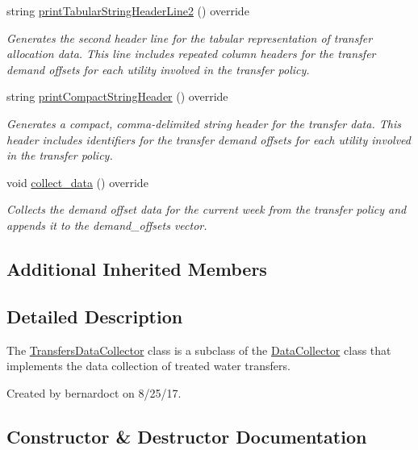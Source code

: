 \begin{DoxyCompactItemize}
string \mbox{\hyperlink{classTransfersDataCollector_ade6b896383f079d8973076e6b9a8053a}{print\+Tabular\+String\+Header\+Line2}} () override
\begin{DoxyCompactList}\small\item\em Generates the second header line for the tabular representation of transfer allocation data. This line includes repeated column headers for the transfer demand offsets for each utility involved in the transfer policy. \end{DoxyCompactList}\item 
string \mbox{\hyperlink{classTransfersDataCollector_a29750b8b76fa82d70d4f472a0e36ceba}{print\+Compact\+String\+Header}} () override
\begin{DoxyCompactList}\small\item\em Generates a compact, comma-\/delimited string header for the transfer data. This header includes identifiers for the transfer demand offsets for each utility involved in the transfer policy. \end{DoxyCompactList}\item 
void \mbox{\hyperlink{classTransfersDataCollector_a2f5c4427699aab547ea0d3b74993752b}{collect\+\_\+data}} () override
\begin{DoxyCompactList}\small\item\em Collects the demand offset data for the current week from the transfer policy and appends it to the {\ttfamily demand\+\_\+offsets} vector. \end{DoxyCompactList}\end{DoxyCompactItemize}
\subsection*{Additional Inherited Members}


\subsection{Detailed Description}
The {\ttfamily \mbox{\hyperlink{classTransfersDataCollector}{Transfers\+Data\+Collector}}} class is a subclass of the {\ttfamily \mbox{\hyperlink{classDataCollector}{Data\+Collector}}} class that implements the data collection of treated water transfers. 

Created by bernardoct on 8/25/17. 

\subsection{Constructor \& Destructor Documentation}
\mbox{\label{classTransfersDataCollector_a757289856b49a212a16b6263bfab8b7d}} 
